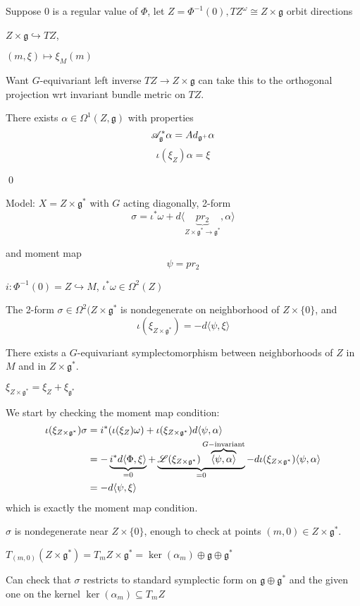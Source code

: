 \documentclass[x11names,reqno,14pt]{extarticle}
\newcommand{\mk}[1]{\mathfrak{#1}}
\newcommand{\g}{\mk{g}}
\newcommand{\into}{\hookrightarrow}
\begin{document}
Suppose 0 is a regular value of $\Phi$, let $Z = \Phi^{-1}(0), TZ^\omega\cong Z\times\mk{g}$ orbit directions

$Z\times\g\into TZ$, 

$(m,\xi) \mapsto\xi_M(m)$

Want $G$-equivariant left inverse $TZ \to Z\times\g$ can take this to the orthogonal projection wrt invariant bundle metric on $TZ$.

\lem

There exists $\alpha\in\Omega^1(Z,\g)$ with properties
\[
\ms{A}_\g^*\alpha = Ad_{\g^+}\alpha
\]
\[
\iota(\xi_Z)\alpha = \xi
\]

\proof

\qed

Model: $X = Z\times\g^*$ with $G$ acting diagonally, 2-form 
\[
\sigma = \iota^*\omega + d\langle\underbrace{pr_2}_{Z\times\g^*\to\g^*},\alpha\rangle
\]

and moment map 
\[
\psi = pr_2
\]

$i:\Phi^{-1}(0) = Z \into M$, $\iota^*\omega\in\Omega^2(Z)$

\thm

The 2-form $\sigma \in \Omega^2(Z\times\g^*$ is nondegenerate on neighborhood of $Z\times\{0\}$, and 
\[
\iota(\xi_{Z\times\g^*}) = -d\langle\psi,\xi\rangle
\]

There exists a $G$-equivariant symplectomorphism between neighborhoods of $Z$ in $M$ and in $Z\times\g^*$. 

\proof

$\xi_{Z\times\g^*} = \xi_Z + \xi_{\g^*}$

We start by checking the moment map condition: 
\begin{align*}
\iota(\xi_{Z\times\g^*})\sigma & = i^*(\iota(\xi_Z)\omega) + \iota(\xi_{Z\times\g^*})d\langle\psi,\alpha\rangle \\
& = -\underbrace{i^*d\langle\Phi,\xi\rangle}_{=0} + \underbrace{\ms{L}(\xi_{Z\times\g^*})\overbrace{\langle\psi,\alpha\rangle}^{G-\text{invariant}}}_{=0} - d\iota(\xi_{Z\times\g^*})\langle\psi,\alpha\rangle \\
& = -d\langle\psi,\xi\rangle
\end{align*}
which is exactly the moment map condition. 

$\sigma$ is nondegenerate near $Z\times\{0\}$, enough to check at points $(m,0) \in Z\times\g^*$. 

$T_{(m,0)}(Z\times\g^*) =T_mZ\times\g^* =  \ker(\alpha_m)\oplus\g\oplus\g^*$

Can check that $\sigma$ restricts to standard symplectic form on $\g\oplus\g^*$ and the given one on the kernel $\ker(\alpha_m) \subseteq T_mZ$
\end{document}
